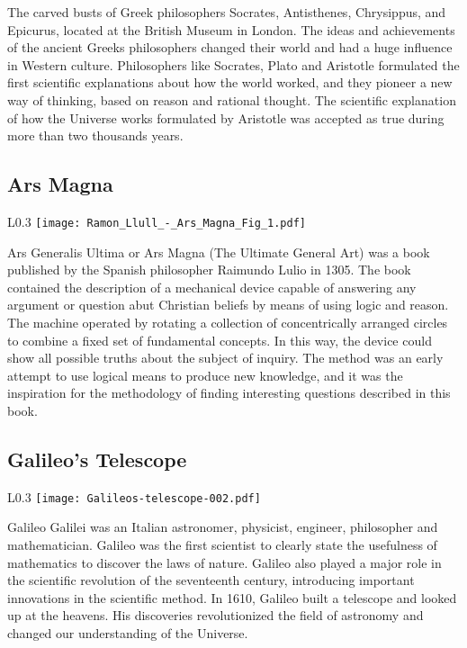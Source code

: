 The carved busts of Greek philosophers Socrates, Antisthenes, Chrysippus, and Epicurus, located at the British Museum in London. The ideas and achievements of the ancient Greeks philosophers changed their world and had a huge influence in Western culture. Philosophers like Socrates, Plato and Aristotle formulated the first scientific explanations about how the world worked, and they pioneer a new way of thinking, based on reason and rational thought. The scientific explanation of how the Universe works formulated by Aristotle was accepted as true during more than two thousands years.

\subsection* {Ars Magna}

\begin{wrapfigure}{L}{0.3\textwidth}
\centering
\texttt{[image: Ramon\_Llull\_-\_Ars\_Magna\_Fig\_1.pdf]}
\end{wrapfigure}

Ars Generalis Ultima or Ars Magna (The Ultimate General Art) was a book published by the Spanish philosopher Raimundo Lulio in 1305. The book contained the description of a mechanical device capable of answering any argument or question abut Christian beliefs by means of using logic and reason. The machine operated by rotating a collection of concentrically arranged circles to combine a fixed set of fundamental concepts. In this way, the device could show all possible truths about the subject of inquiry. The method was an early attempt to use logical means to produce new knowledge, and it was the inspiration for the methodology of finding interesting questions described in this book.

\subsection* {Galileo's Telescope}

\begin{wrapfigure}{L}{0.3\textwidth}
\centering
\texttt{[image: Galileos-telescope-002.pdf]}
\end{wrapfigure}

Galileo Galilei was an Italian astronomer, physicist, engineer, philosopher and mathematician. Galileo was the first scientist to clearly state the usefulness of mathematics to discover the laws of nature. Galileo also played a major role in the scientific revolution of the seventeenth century, introducing important innovations in the scientific method. In 1610, Galileo built a telescope and looked up at the heavens. His discoveries revolutionized the field of astronomy and changed our understanding of the Universe.

